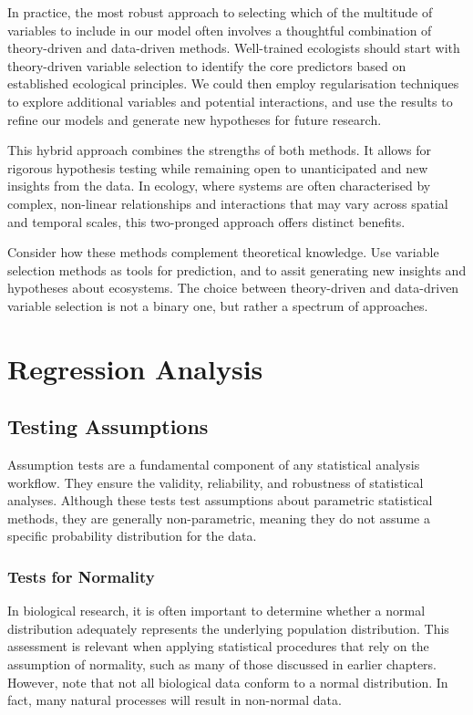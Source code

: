 \documentclass[
  letterpaper,
]{book}
\begin{document}
In practice, the most robust approach to selecting which of the
multitude of variables to include in our model often involves a
thoughtful combination of theory-driven and data-driven methods.
Well-trained ecologists should start with theory-driven variable
selection to identify the core predictors based on established
ecological principles. We could then employ regularisation techniques to
explore additional variables and potential interactions, and use the
results to refine our models and generate new hypotheses for future
research.

This hybrid approach combines the strengths of both methods. It allows
for rigorous hypothesis testing while remaining open to unanticipated
and new insights from the data. In ecology, where systems are often
characterised by complex, non-linear relationships and interactions that
may vary across spatial and temporal scales, this two-pronged approach
offers distinct benefits.

Consider how these methods complement theoretical knowledge. Use
variable selection methods as tools for prediction, and to assit
generating new insights and hypotheses about ecosystems. The choice
between theory-driven and data-driven variable selection is not a binary
one, but rather a spectrum of approaches.

\part{Regression Analysis}

\chapter{Testing Assumptions}\label{sec-assumption-tests}

Assumption tests are a fundamental component of any statistical analysis
workflow. They ensure the validity, reliability, and robustness of
statistical analyses. Although these tests test assumptions about
parametric statistical methods, they are generally non-parametric,
meaning they do not assume a specific probability distribution for the
data.

\section{Tests for Normality}\label{tests-for-normality}

In biological research, it is often important to determine whether a
normal distribution adequately represents the underlying population
distribution. This assessment is relevant when applying statistical
procedures that rely on the assumption of normality, such as many of
those discussed in earlier chapters. However, note that not all
biological data conform to a normal distribution. In fact, many natural
processes will result in non-normal data.
\end{document}
